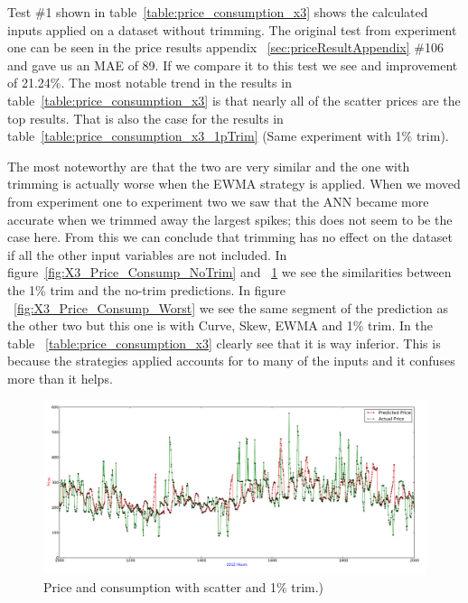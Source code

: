 Test \#1 shown in table~\ref{table:price_consumption_x3} shows the calculated inputs applied on a dataset without trimming. The original test from experiment one can be seen in the price results appendix ~\ref{sec:priceResultAppendix} \#106 and gave us an MAE of 89. If we compare it to this test we see and improvement of 21.24\%. The most notable trend in the results in table~\ref{table:price_consumption_x3} is that nearly all of the scatter prices are the top results. That is also the case for the results in table~\ref{table:price_consumption_x3_1pTrim} (Same experiment with 1\% trim).

The most noteworthy are that the two are very similar and the one with trimming is actually worse when the EWMA strategy is applied. When we moved from experiment one to experiment two we saw that the ANN became more accurate when we trimmed away the largest spikes; this does not seem to be the case here. From this we can conclude that trimming has no effect on the dataset if all the other input variables are not included. In figure~\ref{fig:X3_Price_Consump_NoTrim} and ~\ref{fig:X3_Price_Consump_1pTrim} we see the similarities between the 1\% trim and the no-trim predictions. In figure ~\ref{fig:X3_Price_Consump_Worst} we see the same segment of the prediction as the other two but this one is with Curve, Skew, EWMA and 1\% trim. In the table ~\ref{table:price_consumption_x3} clearly see that it is way inferior. This is because the strategies applied accounts for to many of the inputs and it confuses more than it helps.

\begin{figure}[H]
\centering
\includegraphics[width=\linewidth]{billeder/PriceExperimentalAnalysis/X3_Price_Consump_1pTrim.png}
\caption{Price and consumption with scatter and 1\% trim.)}
\label{fig:X3_Price_Consump_1pTrim}
\end{figure}

